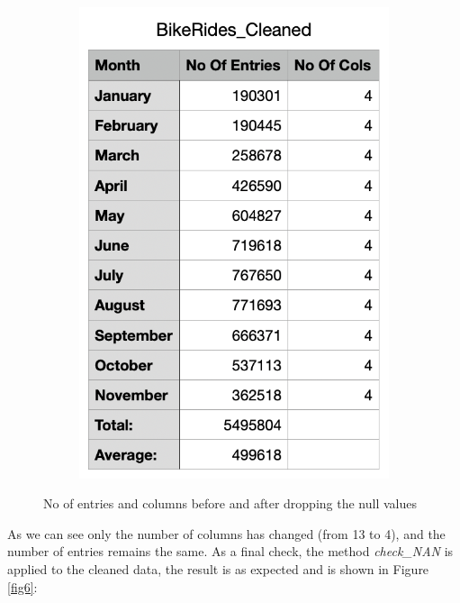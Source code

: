 \documentclass[12pt]{article}
\begin{document}
\begin{itemize}
\begin{figure}[h]
\begin{subfigure}{.4\textwidth}
		\includegraphics[scale=0.5]{img4.png}
	\end{subfigure}
	\caption{No of entries and columns before and after dropping the null values}
	\label{fig5}
	\end{figure}
	
	As we can see only the number of columns has changed (from 13 to 4), and the number of entries remains the same. As a final check, the method \textit{check\_NAN} is applied to the cleaned data, the result is as expected and is shown in Figure \ref{fig6}:
	

\end{itemize}
\end{document}
